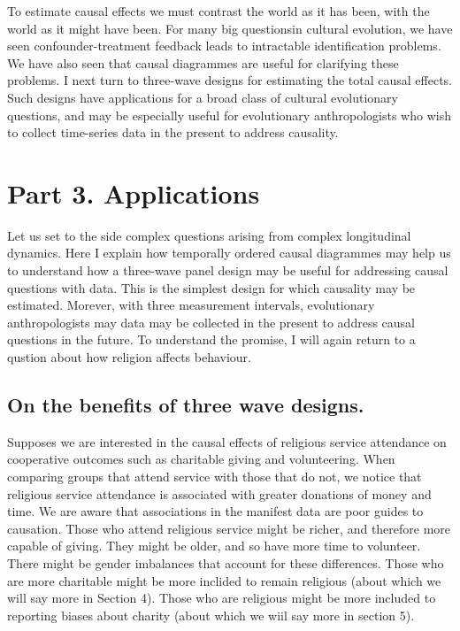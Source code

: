 \documentclass[
  singlecolumn]{report}
\begin{document}
To estimate causal effects we must contrast the world as it has been,
with the world as it might have been. For many big questionsin cultural
evolution, we have seen confounder-treatment feedback leads to
intractable identification problems. We have also seen that causal
diagrammes are useful for clarifying these problems. I next turn to
three-wave designs for estimating the total causal effects. Such designs
have applications for a broad class of cultural evolutionary questions,
and may be especially useful for evolutionary anthropologists who wish
to collect time-series data in the present to address causality.

\hypertarget{part-3.-applications}{%
\section{Part 3. Applications}\label{part-3.-applications}}

Let us set to the side complex questions arising from complex
longitudinal dynamics. Here I explain how temporally ordered causal
diagrammes may help us to understand how a three-wave panel design may
be useful for addressing causal questions with data. This is the
simplest design for which causality may be estimated. Morever, with
three measurement intervals, evolutionary anthropologists may data may
be collected in the present to address causal questions in the future.
To understand the promise, I will again return to a qustion about how
religion affects behaviour.

\hypertarget{on-the-benefits-of-three-wave-designs.}{%
\subsection{On the benefits of three wave
designs.}\label{on-the-benefits-of-three-wave-designs.}}

Supposes we are interested in the causal effects of religious service
attendance on cooperative outcomes such as charitable giving and
volunteering. When comparing groups that attend service with those that
do not, we notice that religious service attendance is associated with
greater donations of money and time. We are aware that associations in
the manifest data are poor guides to causation. Those who attend
religious service might be richer, and therefore more capable of giving.
They might be older, and so have more time to volunteer. There might be
gender imbalances that account for these differences. Those who are more
charitable might be more inclided to remain religious (about which we
will say more in Section 4). Those who are religious might be more
included to reporting biases about charity (about which we wiil say more
in section 5).
\end{document}
